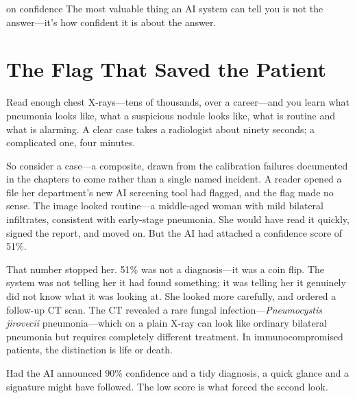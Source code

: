 
\label{chap:ch02}
\begin{chapterquote}{on confidence}
The most valuable thing an AI system can tell you is not the answer---it's how confident it is about the answer.
\end{chapterquote}

\section{The Flag That Saved the Patient}

Read enough chest X-rays---tens of thousands, over a career---and you learn what pneumonia looks like, what a suspicious nodule looks like, what is routine and what is alarming. A clear case takes a radiologist about ninety seconds; a complicated one, four minutes.

So consider a case---a composite, drawn from the calibration failures documented in the chapters to come rather than a single named incident. A reader opened a file her department's new AI screening tool had flagged, and the flag made no sense. The image looked routine---a middle-aged woman with mild bilateral infiltrates, consistent with early-stage pneumonia. She would have read it quickly, signed the report, and moved on. But the AI had attached a confidence score of 51\%.

That number stopped her. 51\% was not a diagnosis---it was a coin flip. The system was not telling her it had found something; it was telling her it genuinely did not know what it was looking at. She looked more carefully, and ordered a follow-up CT scan. The CT revealed a rare fungal infection---\emph{Pneumocystis jirovecii} pneumonia---which on a plain X-ray can look like ordinary bilateral pneumonia but requires completely different treatment. In immunocompromised patients, the distinction is life or death.

Had the AI announced 90\% confidence and a tidy diagnosis, a quick glance and a signature might have followed. The low score is what forced the second look.

